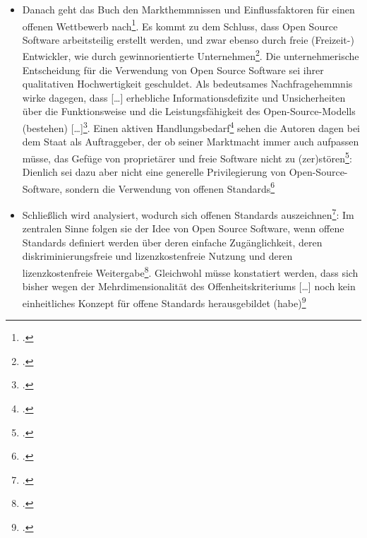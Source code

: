 \documentclass[DIV=calc,BCOR=5mm,11pt,headings=small,oneside,abstract=true, toc=bib]{scrartcl}
\begin{document}
\begin{itemize}
  gewährleisten\grqq{}\footcite[vgl.][119]{Mundhenke2007a}
  \item Danach geht das Buch den \glqq{}Markthemmnissen und
  Einflussfaktoren für einen offenen Wettbewerb\grqq{}
  nach\footcite[vgl.][120ff]{Mundhenke2007a}. Es kommt zu dem Schluss, dass Open
  Source Software \glqq{}arbeitsteilig\grqq{} erstellt werden, und zwar
  ebenso durch \glqq{}freie (Freizeit-) Entwickler\grqq{}, wie durch
  \glqq{}gewinnorientierte
  Unternehmen\grqq{}\footcite[vgl.][165]{Mundhenke2007a}. Die unternehmerische
  Entscheidung für die Verwendung von Open Source Software sei ihrer
  \glqq{}qualitativen Hochwertigkeit\grqq{} geschuldet. Als
  \glqq{}bedeutsames Nachfragehemmnis\grqq{} wirke dagegen, dass \glqq{}[\ldots]
  erhebliche Informationsdefizite und Unsicherheiten über die
  Funktionsweise und die Leistungsfähigkeit des Open-Source-Modells
  (bestehen) [\ldots]\grqq{}\footcite[vgl.][165]{Mundhenke2007a}. Einen
  \glqq{}aktiven Handlungsbedarf\grqq{}\footcite[vgl.][165]{Mundhenke2007a}
  sehen die Autoren dagen bei dem Staat als Auftraggeber, der ob seiner
  Marktmacht immer auch aufpassen müsse, das Gefüge von proprietärer und freie
  Software nicht zu (zer)stören\footcite[vgl.][165f]{Mundhenke2007a}: Dienlich
  sei dazu aber nicht eine \glqq{}generelle Privilegierung von
  Open-Source-Software\grqq{}, sondern die Verwendung von \glqq{}offenen
  Standards\grqq{}\footcite[vgl.][166]{Mundhenke2007a}
  \item Schließlich wird analysiert, wodurch sich offenen Standards
  auszeichnen\footcite[vgl.][168ff]{Mundhenke2007a}: Im zentralen Sinne folgen
  sie der Idee von Open Source Software, wenn offene Standards definiert werden
  über deren  \glqq{}einfache Zugänglichkeit\grqq{}, deren
  \glqq{}diskriminierungsfreie\grqq{} und \glqq{}lizenzkostenfreie
  Nutzung\grqq{} und deren \glqq{}lizenzkostenfreie
  Weitergabe\grqq{}\footcite[vgl.][175]{Mundhenke2007a}. Gleichwohl müsse
  konstatiert werden, dass sich bisher \glqq{}wegen der
  Mehrdimensionalität des Offenheitskriteriums [\ldots] noch kein
  einheitliches Konzept für offene Standards herausgebildet
  (habe)\grqq{}\footcite[vgl.][189]{Mundhenke2007a}
\end{itemize}
\end{document}
